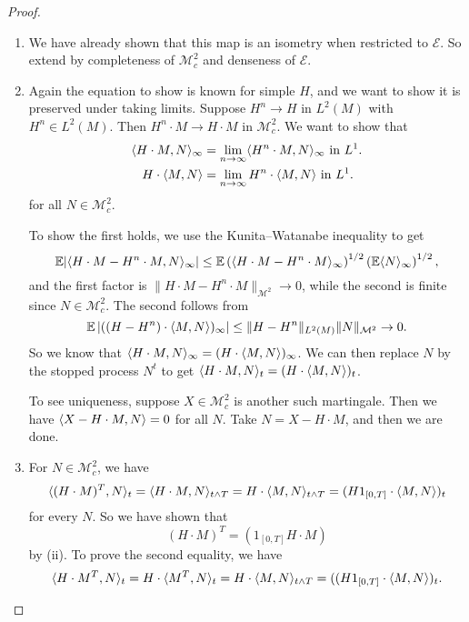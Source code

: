 \documentclass[a4paper]{article}
\begin{document}
\begin{proof}\leavevmode
  \begin{enumerate}
    \item We have already shown that this map is an isometry when restricted to $\mathcal{E}$. So extend by completeness of $\mathcal{M}_c^2$ and denseness of $\mathcal{E}$.
    \item Again the equation to show is known for simple $H$, and we want to show it is preserved under taking limits. Suppose $H^n \to H$ in $L^2(M)$ with $H^n \in L^2(M)$. Then $H^n \cdot M \to H \cdot M$ in $\mathcal{M}_c^2$. We want to show that
      \begin{align*}
        \langle H \cdot M, N\rangle_\infty &= \lim_{n \to \infty} \langle H^n \cdot M, N\rangle_\infty\text{ in }L^1.\\
        H \cdot \langle M, N\rangle &= \lim_{n \to \infty} H^n \cdot \langle M, N\rangle\text{ in }L^1.
      \end{align*}
      for all $N \in \mathcal{M}_c^2$.

      To show the first holds, we use the Kunita--Watanabe inequality to get
      \[
        \mathbb{E} |\langle H \cdot M - H^n \cdot M, N\rangle_\infty| \leq \mathbb{E} \left(\langle H \cdot M - H^n \cdot M\rangle_\infty\right)^{1/2} \left(\mathbb{E} \langle N\rangle_\infty\right)^{1/2},
      \]
      and the first factor is $\|H \cdot M - H^n \cdot M\|_{\mathcal{M}^2} \to 0$, while the second is finite since $N \in \mathcal{M}_c^2$. The second follows from
      \[
        \mathbb{E} \left|((H - H^n) \cdot \langle M, N\rangle)_\infty\right| \leq \|H - H^n\|_{L^2(M)} \|N\|_{\mathcal{M}^2} \to 0.
      \]
      So we know that $\langle H \cdot M, N\rangle_\infty = (H \cdot \langle M, N\rangle)_\infty$. We can then replace $N$ by the stopped process $N^t$ to get $\langle H \cdot M, N\rangle_t = (H \cdot \langle M, N\rangle)_t$.

      To see uniqueness, suppose $X \in \mathcal{M}_c^2$ is another such martingale. Then we have $\langle X - H \cdot M, N\rangle = 0$ for all $N$. Take $N = X - H \cdot M$, and then we are done.
    \item For $N \in \mathcal{M}^2_c$, we have
      \[
        \langle (H \cdot M)^T, N\rangle_t = \langle H \cdot M, N \rangle_{t \wedge T} = H \cdot \langle M, N\rangle_{t \wedge T} = (H 1_{[0, T]} \cdot \langle M, N\rangle)_t
      \]
      for every $N$. So we have shown that
      \[
        (H \cdot M)^T = (1_{[0, T]} H \cdot M)
      \]
      by (ii). To prove the second equality, we have
      \[
        \langle H \cdot M^T, N\rangle_t = H \cdot \langle M^T, N\rangle_t = H \cdot \langle M, N\rangle_{t \wedge T} = ((H1_{[0, T]} \cdot \langle M, N\rangle)_t.\qedhere
      \]%
  \end{enumerate}
\end{proof}
\end{document}
